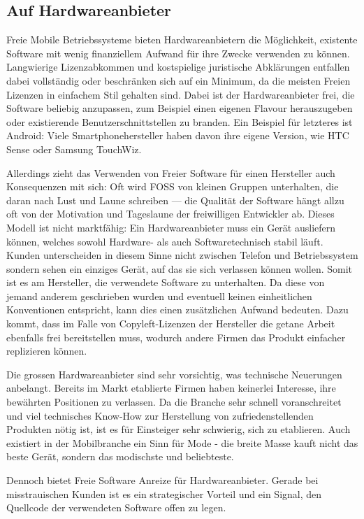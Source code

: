 \subsection{Auf Hardwareanbieter}
Freie Mobile Betriebssysteme bieten Hardwareanbietern die Möglichkeit, existente Software mit wenig finanziellem Aufwand für ihre Zwecke verwenden zu können. Langwierige Lizenzabkommen und kostspielige juristische Abklärungen entfallen dabei vollständig oder beschränken sich auf ein Minimum, da die meisten Freien Lizenzen in einfachem Stil gehalten sind. Dabei ist der Hardwareanbieter frei, die Software beliebig anzupassen, zum Beispiel einen eigenen Flavour herauszugeben oder existierende Benutzerschnittstellen zu branden. Ein Beispiel für letzteres ist Android: Viele Smartphonehersteller haben davon ihre eigene Version, wie HTC Sense oder Samsung TouchWiz.

Allerdings zieht das Verwenden von Freier Software für einen Hersteller auch Konsequenzen mit sich: Oft wird FOSS von kleinen Gruppen unterhalten, die daran nach Lust und Laune schreiben --- die Qualität der Software hängt allzu oft von der Motivation und Tageslaune der freiwilligen Entwickler ab. Dieses Modell ist nicht marktfähig: Ein Hardwareanbieter muss ein Gerät ausliefern können, welches sowohl Hardware- als auch Softwaretechnisch stabil läuft. Kunden unterscheiden in diesem Sinne nicht zwischen Telefon und Betriebssystem sondern sehen ein einziges Gerät, auf das sie sich verlassen können wollen. Somit ist es am Hersteller, die verwendete Software zu unterhalten. Da diese von jemand anderem geschrieben wurden und eventuell keinen einheitlichen Konventionen entspricht, kann dies einen zusätzlichen Aufwand bedeuten. Dazu kommt, dass im Falle von Copyleft-Lizenzen der Hersteller die getane Arbeit ebenfalls frei bereitstellen muss, wodurch andere Firmen das Produkt einfacher replizieren können.

Die grossen Hardwareanbieter sind sehr vorsichtig, was technische Neuerungen anbelangt. Bereits im Markt etablierte Firmen haben keinerlei Interesse, ihre bewährten Positionen zu verlassen. Da die Branche sehr schnell voranschreitet und viel technisches Know-How zur Herstellung von zufriedenstellenden Produkten nötig ist, ist es für Einsteiger sehr schwierig, sich zu etablieren. Auch existiert in der Mobilbranche ein Sinn für Mode - die breite Masse kauft nicht das beste Gerät, sondern das modischste und beliebteste.

Dennoch bietet Freie Software Anreize für Hardwareanbieter. Gerade bei misstrauischen Kunden ist es ein strategischer Vorteil und ein Signal, den Quellcode der verwendeten Software offen zu legen.
\columnbreak

